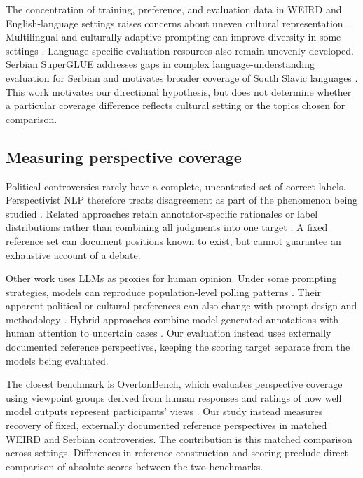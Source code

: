 \documentclass[11pt,a4paper]{article}
\begin{document}
The concentration of training, preference, and evaluation data in WEIRD and English-language settings raises concerns about uneven cultural representation \cite{sorensenRoadmapPluralisticAlignment2024, wangMultilingualPromptingImproving2025, zewailMoralStereotypingLarge2026}. Multilingual and culturally adaptive prompting can improve diversity in some settings \cite{wangMultilingualPromptingImproving2025}. Language-specific evaluation resources also remain unevenly developed. Serbian SuperGLUE addresses gaps in complex language-understanding evaluation for Serbian and motivates broader coverage of South Slavic languages \cite{perovicSerbianSuperGLUEEvaluation2026}. This work motivates our directional hypothesis, but does not determine whether a particular coverage difference reflects cultural setting or the topics chosen for comparison.

\subsection{Measuring perspective coverage}
\label{sec:Measuring perspective coverage}
Political controversies rarely have a complete, uncontested set of correct labels. Perspectivist NLP therefore treats disagreement as part of the phenomenon being studied \cite{basileWeNeedConsider2021, plankProblemHumanLabel2022a, frendaPerspectivistApproachesNatural2025a}. Related approaches retain annotator-specific rationales or label distributions rather than combining all judgments into one target \cite{sarumiFineGrainedPerspectivesModeling2026, shettyLearningWhoDisagrees2026}. A fixed reference set can document positions known to exist, but cannot guarantee an exhaustive account of a debate.

Other work uses LLMs as proxies for human opinion. Under some prompting strategies, models can reproduce population-level polling patterns \cite{sunRandomSiliconSampling2024, gongCharacterizingAbilityLLMs2026}. Their apparent political or cultural preferences can also change with prompt design and methodology \cite{khanRandomnessNotRepresentation2025}. Hybrid approaches combine model-generated annotations with human attention to uncertain cases \cite{mehrotraMultiPerspectiveLLMAnnotations2026}. Our evaluation instead uses externally documented reference perspectives, keeping the scoring target separate from the models being evaluated.

The closest benchmark is OvertonBench, which evaluates perspective coverage using viewpoint groups derived from human responses and ratings of how well model outputs represent participants' views \cite{poole-dayanBenchmarkingOvertonPluralism2025}. Our study instead measures recovery of fixed, externally documented reference perspectives in matched WEIRD and Serbian controversies. The contribution is this matched comparison across settings. Differences in reference construction and scoring preclude direct comparison of absolute scores between the two benchmarks.
\end{document}
